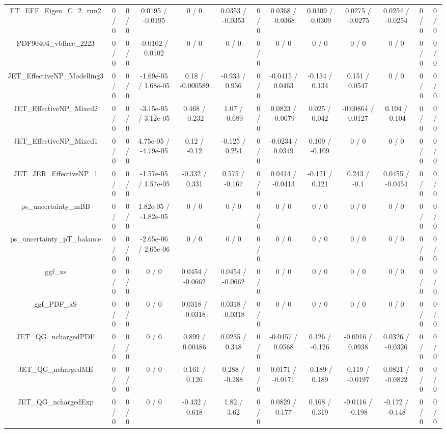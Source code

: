 \documentclass[10pt]{article}
\begin{document}
\begin{table}[htbp]
\begin{center}
\begin{tabular}{|c|c|c|c|c|c|c|c|c|c|c|c|c|}
  FT_EFF_Eigen_C_2_run2 & 0 / 0 & 0 / 0 & 0.0195 / -0.0195 & 0 / 0 & 0.0353 / -0.0353 & 0 / 0 & 0.0368 / -0.0368 & 0.0309 / -0.0309 & 0.0275 / -0.0275 & 0.0254 / -0.0254 & 0 / 0 & 0 / 0 \\ 
  PDF90404_vbfhcc_2223 & 0 / 0 & 0 / 0 & -0.0102 / 0.0102 & 0 / 0 & 0 / 0 & 0 / 0 & 0 / 0 & 0 / 0 & 0 / 0 & 0 / 0 & 0 / 0 & 0 / 0 \\ 
  JET_EffectiveNP_Modelling3 & 0 / 0 & 0 / 0 & -1.69e-05 / 1.68e-05 & 0.18 / -0.000589 & -0.933 / 0.936 & 0 / 0 & -0.0415 / 0.0463 & -0.134 / 0.134 & 0.151 / 0.0547 & 0 / 0 & 0 / 0 & 0 / 0 \\ 
  JET_EffectiveNP_Mixed2 & 0 / 0 & 0 / 0 & -3.15e-05 / 3.12e-05 & 0.468 / -0.232 & 1.07 / -0.689 & 0 / 0 & 0.0823 / -0.0679 & 0.025 / 0.042 & -0.00864 / 0.0127 & 0.104 / -0.104 & 0 / 0 & 0 / 0 \\ 
  JET_EffectiveNP_Mixed1 & 0 / 0 & 0 / 0 & 4.75e-05 / -4.79e-05 & 0.12 / -0.12 & -0.125 / 0.254 & 0 / 0 & -0.0234 / 0.0349 & 0.109 / -0.109 & 0 / 0 & 0 / 0 & 0 / 0 & 0 / 0 \\ 
  JET_JER_EffectiveNP_1 & 0 / 0 & 0 / 0 & -1.57e-05 / 1.57e-05 & -0.332 / 0.331 & 0.575 / -0.167 & 0 / 0 & 0.0414 / -0.0413 & -0.121 / 0.121 & 0.243 / -0.1 & 0.0455 / -0.0454 & 0 / 0 & 0 / 0 \\ 
  ps_uncertainty_mBB & 0 / 0 & 0 / 0 & 1.82e-05 / -1.82e-05 & 0 / 0 & 0 / 0 & 0 / 0 & 0 / 0 & 0 / 0 & 0 / 0 & 0 / 0 & 0 / 0 & 0 / 0 \\ 
  ps_uncertainty_pT_balance & 0 / 0 & 0 / 0 & -2.65e-06 / 2.65e-06 & 0 / 0 & 0 / 0 & 0 / 0 & 0 / 0 & 0 / 0 & 0 / 0 & 0 / 0 & 0 / 0 & 0 / 0 \\ 
  ggf_xs & 0 / 0 & 0 / 0 & 0 / 0 & 0.0454 / -0.0662 & 0.0454 / -0.0662 & 0 / 0 & 0 / 0 & 0 / 0 & 0 / 0 & 0 / 0 & 0 / 0 & 0 / 0 \\ 
  ggf_PDF_aS & 0 / 0 & 0 / 0 & 0 / 0 & 0.0318 / -0.0318 & 0.0318 / -0.0318 & 0 / 0 & 0 / 0 & 0 / 0 & 0 / 0 & 0 / 0 & 0 / 0 & 0 / 0 \\ 
  JET_QG_nchargedPDF & 0 / 0 & 0 / 0 & 0 / 0 & 0.899 / 0.00486 & 0.0235 / 0.348 & 0 / 0 & -0.0457 / 0.0568 & 0.126 / -0.126 & -0.0916 / 0.0938 & 0.0326 / -0.0326 & 0 / 0 & 0 / 0 \\ 
  JET_QG_nchargedME & 0 / 0 & 0 / 0 & 0 / 0 & 0.161 / 0.126 & 0.288 / -0.288 & 0 / 0 & 0.0171 / -0.0171 & -0.189 / 0.189 & 0.119 / -0.0197 & 0.0821 / -0.0822 & 0 / 0 & 0 / 0 \\ 
  JET_QG_nchargedExp & 0 / 0 & 0 / 0 & 0 / 0 & -0.432 / 0.618 & 1.82 / 3.62 & 0 / 0 & 0.0829 / 0.177 & 0.168 / 0.319 & -0.0116 / -0.198 & -0.172 / -0.148 & 0 / 0 & 0 / 0 \\ 

\end{tabular}
\end{center}
\end{table}
\end{document}
